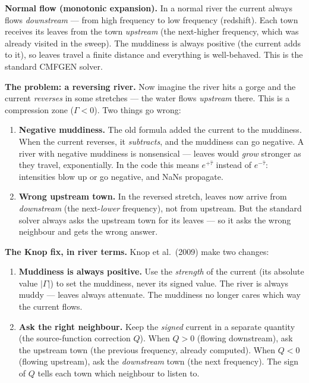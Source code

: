 \documentclass[11pt]{article}
\begin{document}
\medskip\noindent
\textbf{Normal flow (monotonic expansion).}\quad
In a normal river the current always flows \emph{downstream} --- from
high frequency to low frequency (redshift).  Each town receives its
leaves from the town \emph{upstream} (the next-higher frequency, which
was already visited in the sweep).  The muddiness is always positive
(the current adds to it), so leaves travel a finite distance and
everything is well-behaved.  This is the standard CMFGEN solver.

\medskip\noindent
\textbf{The problem: a reversing river.}\quad
Now imagine the river hits a gorge and the current \emph{reverses} in
some stretches --- the water flows \emph{upstream} there.  This is a
compression zone ($\Gamma < 0$).  Two things go wrong:

\begin{enumerate}[nosep]
  \item \textbf{Negative muddiness.}  The old formula added the current
        to the muddiness.  When the current reverses, it
        \emph{subtracts}, and the muddiness can go negative.  A river
        with negative muddiness is nonsensical --- leaves would
        \emph{grow} stronger as they travel, exponentially.  In the
        code this means $e^{+\hat\tau}$ instead of $e^{-\hat\tau}$:
        intensities blow up or go negative, and NaNs propagate.
  \item \textbf{Wrong upstream town.}  In the reversed stretch, leaves
        now arrive from \emph{downstream} (the next-\emph{lower}
        frequency), not from upstream.  But the standard solver always
        asks the upstream town for its leaves --- so it asks the wrong
        neighbour and gets the wrong answer.
\end{enumerate}

\medskip\noindent
\textbf{The Knop fix, in river terms.}\quad
Knop et al.\ (2009) make two changes:

\begin{enumerate}[nosep]
  \item \textbf{Muddiness is always positive.}  Use the
        \emph{strength} of the current (its absolute value $|\Gamma|$)
        to set the muddiness, never its signed value.  The river is
        always muddy --- leaves always attenuate.  The muddiness no
        longer cares which way the current flows.

  \item \textbf{Ask the right neighbour.}  Keep the \emph{signed}
        current in a separate quantity (the source-function correction
        $Q$).  When $Q > 0$ (flowing downstream), ask the upstream town
        (the previous frequency, already computed).  When $Q < 0$
        (flowing upstream), ask the \emph{downstream} town (the next
        frequency).  The sign of $Q$ tells each town which neighbour to
        listen to.
\end{enumerate}
\end{document}
